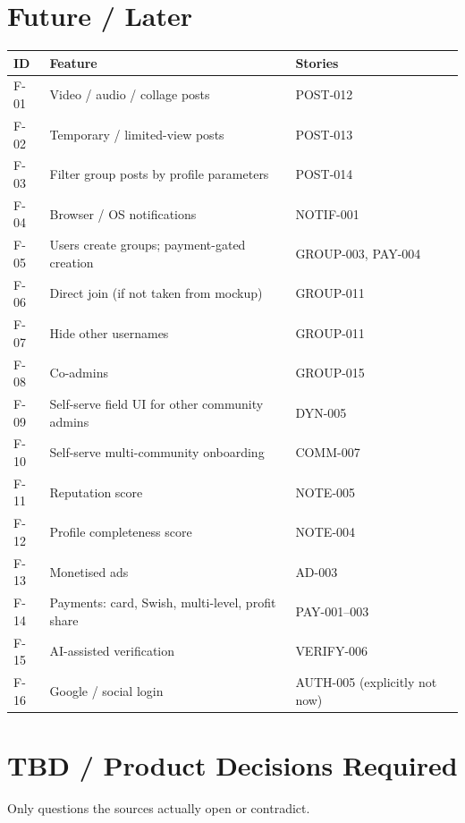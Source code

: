 \documentclass[11pt,a4paper]{article}
\begin{document}
\section{Future / Later}
\begin{longtable}{@{}p{2.3cm}p{5.4cm}p{6.4cm}@{}}
\toprule
\textbf{ID} & \textbf{Feature} & \textbf{Stories} \\
\midrule
\endhead
F-01 & Video / audio / collage posts & POST-012 \\
F-02 & Temporary / limited-view posts & POST-013 \\
F-03 & Filter group posts by profile parameters & POST-014 \\
F-04 & Browser / OS notifications & NOTIF-001 \\
F-05 & Users create groups; payment-gated creation & GROUP-003, PAY-004 \\
F-06 & Direct join (if not taken from mockup) & GROUP-011 \\
F-07 & Hide other usernames & GROUP-011 \\
F-08 & Co-admins & GROUP-015 \\
F-09 & Self-serve field UI for other community admins & DYN-005 \\
F-10 & Self-serve multi-community onboarding & COMM-007 \\
F-11 & Reputation score & NOTE-005 \\
F-12 & Profile completeness score & NOTE-004 \\
F-13 & Monetised ads & AD-003 \\
F-14 & Payments: card, Swish, multi-level, profit share & PAY-001--003 \\
F-15 & AI-assisted verification & VERIFY-006 \\
F-16 & Google / social login & AUTH-005 (explicitly not now) \\
\bottomrule
\end{longtable}

\section{TBD / Product Decisions Required}
Only questions the sources actually open or contradict.
\end{document}
